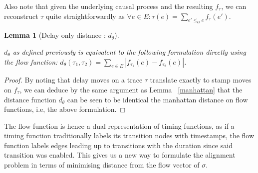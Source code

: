 \documentclass[conference]{IEEEtran}
\newtheorem{lemma}[theorem]{Lemma}
\begin{document}
		Also note that given the underlying causal process and the resulting $f_\tau$, we can reconstruct $\tau$ quite straightforwardly as $\forall e \in E : \tau(e) = \sum_{e' \leq_G e} f_\tau(e')$.
		
		\begin{lemma}[Delay only distance : $d_\theta$]\label{manhattan2}
			
			$d_\theta$ as defined previously is equivalent to the following formulation directly using the flow function:
			$d_\theta(\tau_1, \tau_2) = \sum_{e \in E}|f_{\tau_1}(e) - f_{\tau_2}(e)|$.
		\end{lemma}	
				
	\begin{proof}
		By noting that delay moves on a trace $\tau$ translate exactly to stamp moves on $f_\tau$, we can deduce by the same argument as Lemma ~\ref{manhattan} that the distance function $d_\theta$ can be seen to be identical the manhattan distance on flow functions, i.e, the above formulation. 
	\end{proof}
	
		The flow function is hence a dual representation of timing functions, as if a timing function traditionally labels its transition nodes with timestamps, the flow function labels edges leading up to transitions with the duration since said transition was enabled. This gives us a new way to formulate the alignment problem in terms of minimising distance from the flow vector of $\sigma$. 
		
\end{document}
